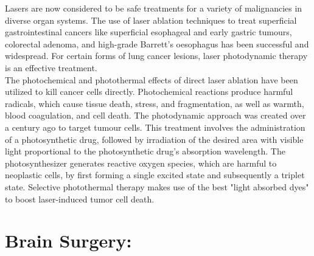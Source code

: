 \documentclass[12pt]{article}
\begin{document}
\hspace{2.5cm}Lasers are now considered to be safe treatments for a variety of malignancies in diverse organ systems.
The use of laser ablation techniques to treat superficial gastrointestinal cancers like superficial esophageal and early gastric tumours, colorectal adenoma, and high-grade Barrett's oesophagus has been successful and widespread. For certain forms of lung cancer lesions, laser photodynamic therapy is an effective treatment.\\
\indent
\hspace{2cm} The photochemical and photothermal effects of direct laser ablation have been utilized to kill cancer cells directly. Photochemical reactions produce harmful radicals, which cause tissue death, stress, and fragmentation, as well as warmth, blood coagulation, and cell death. The photodynamic approach was created over a century ago to target tumour cells. This treatment involves the administration of a photosynthetic drug, followed by irradiation of the desired area with visible light proportional to the photosynthetic drug's absorption wavelength. The photosynthesizer generates reactive oxygen species, which are harmful to neoplastic cells, by first forming a single excited state and subsequently a triplet state. Selective photothermal therapy makes use of the best "light absorbed dyes" to boost laser-induced tumor cell death. \\

\section{Brain Surgery:}
\end{document}
